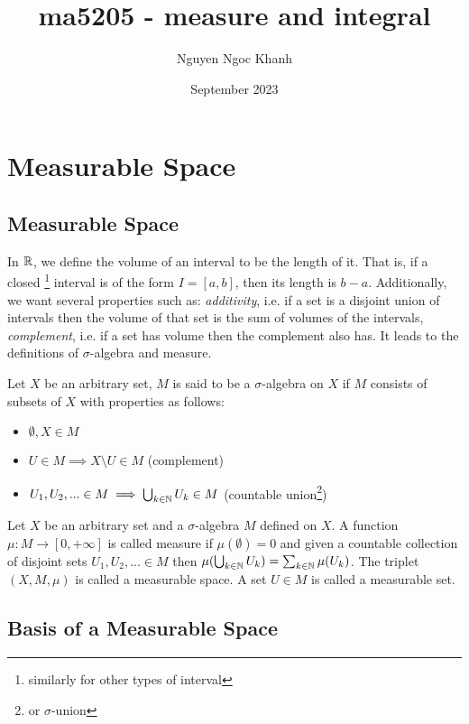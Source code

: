\documentclass{report}
\title{ma5205 - measure and integral}
\author{Nguyen Ngoc Khanh}
\date{September 2023}
\begin{document}
\maketitle

\chapter{Measurable Space}

\section{Measurable Space}

In $\mathbb{R}$, we define the volume of an interval to be the length of it. That is, if a closed \footnote{similarly for other types of interval} interval is of the form $I = [a, b]$, then its length is $b - a$. Additionally, we want several properties such as: \textit{additivity}, i.e. if a set is a disjoint union of intervals then the volume of that set is the sum of volumes of the intervals, \textit{complement}, i.e. if a set has volume then the complement also has. It leads to the definitions of $\sigma$-algebra and measure.

\begin{definition}
    Let $X$ be an arbitrary set, $M$ is said to be a $\sigma$-algebra on $X$ if $M$ consists of subsets of $X$ with properties as follows:
    \begin{itemize}
        \item $\emptyset, X \in M$
        \item $U \in M \implies X \setminus U \in M$ (complement)
        \item $U_1, U_2, ... \in M \implies \bigcup_{k \in \mathbb{N}} U_k \in M$ (countable union\footnote{or $\sigma$-union})
    \end{itemize}
\end{definition}

\begin{definition}
    Let $X$ be an arbitrary set and a $\sigma$-algebra $M$ defined on $X$. A function $\mu: M \to [0, +\infty]$ is called measure if $\mu(\emptyset) = 0$ and given a countable collection of disjoint sets $U_1, U_2, ... \in M$ then $\mu(\bigcup_{k \in \mathbb{N}} U_k) = \sum_{k \in \mathbb{N}} \mu(U_k)$. The triplet $(X, M, \mu)$ is called a measurable space. A set $U \in M$ is called a measurable set.
\end{definition}

\section{Basis of a Measurable Space}
\end{document}
